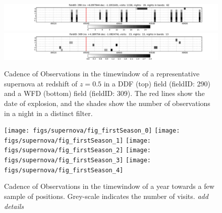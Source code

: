 \begin{figure}[tbh!]
\includegraphics[angle=0,width=\textwidth,clip]{figs/SN_Cadence_290.pdf}
\includegraphics[angle=0,width=\textwidth,clip]{figs/SN_Cadence_309.pdf}
\caption{Cadence of Observations in the timewindow of a representative
supernova at redshift of $z=0.5$ in a DDF (top) field (fieldID: 290) and
a WFD (bottom) field (fieldID: 309). The red lines show the date of
explosion, and the shades show the number of observations in a night in
a distinct filter.}
\label{fig:perSNCadence}
\end{figure}



\begin{figure}[!hb]
    \begin{minipage}[b]{\linewidth}
        \texttt{[image: figs/supernova/fig\_firstSeason\_0]}
        \texttt{[image: figs/supernova/fig\_firstSeason\_1]}
        \texttt{[image: figs/supernova/fig\_firstSeason\_2]}
        \texttt{[image: figs/supernova/fig\_firstSeason\_3]}
        \texttt{[image: figs/supernova/fig\_firstSeason\_4]}
    \end{minipage}
\label{fig:opsimSummary}
\caption{Cadence of Observations in the timewindow of a year towards a few sample of
positions. Grey-scale indicates the number of visits. {\it add details}
}
\end{figure}


